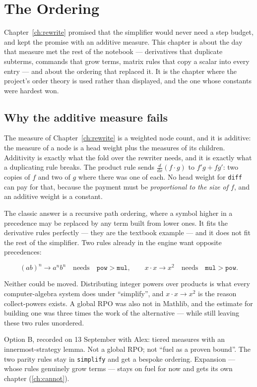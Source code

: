 \chapter{The Ordering}\label{ch:order}

Chapter~\ref{ch:rewrite} promised that the simplifier would never need a step budget, and kept the
promise with an additive measure. This chapter is about the day that measure met the rest of the
notebook --- derivatives that duplicate subterms, commands that grow terms, matrix rules that
copy a scalar into every entry --- and about the ordering that replaced it. It is the chapter
where the project's order theory is used rather than displayed, and the one whose constants were
hardest won.

\section{Why the additive measure fails}

The measure of Chapter~\ref{ch:rewrite} is a weighted node count, and it is additive: the measure
of a node is a head weight plus the measures of its children. Additivity is exactly what the fold
over the rewriter needs, and it is exactly what a duplicating rule breaks. The product rule sends
$\frac{d}{dx}(f \cdot g)$ to $f' g + f g'$: two copies of $f$ and two of $g$ where there was one
of each. No head weight for \texttt{diff} can pay for that, because the payment must be
\emph{proportional to the size of $f$}, and an additive weight is a constant.

The classic answer is a recursive path ordering, where a symbol higher in a precedence may be
replaced by any term built from lower ones. It fits the derivative rules perfectly --- they are the
textbook example --- and it does not fit the rest of the simplifier. Two rules already in the
engine want opposite precedences:

\[
  (ab)^n \to a^n b^n \quad\text{needs}\quad \mathtt{pow} > \mathtt{mul},
  \qquad
  x \cdot x \to x^2 \quad\text{needs}\quad \mathtt{mul} > \mathtt{pow}.
\]

Neither could be moved. Distributing integer powers over products is what every computer-algebra
system does under ``simplify'', and $x \cdot x \to x^2$ is the reason collect-powers exists. A
global RPO was also not in Mathlib, and the estimate for building one was three times the work of
the alternative --- while still leaving these two rules unordered.

\begin{logbox}
  Option B, recorded on 13 September with Alex: tiered measures with an innermost-strategy
  lemma. Not a global RPO; not ``fuel as a proven bound''. The two parity rules stay in
  \texttt{simplify} and get a bespoke ordering. Expansion --- whose rules genuinely grow terms ---
  stays on fuel for now and gets its own chapter (\ref{ch:cannot}).
\end{logbox}

